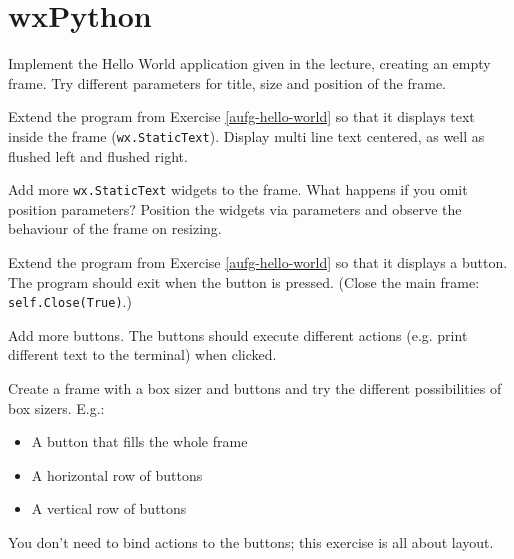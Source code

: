 \section*{wxPython}

\begin{aufgabe}
\label{aufg-hello-world}Implement the Hello World application given in the lecture, creating an empty frame. Try different parameters for title, size and position of the frame.
\end{aufgabe}

\begin{aufgabe}
\begin{teilaufgabe}
Extend the program from Exercise \ref{aufg-hello-world} so that it displays text inside the frame (\lstinline{wx.StaticText}). Display multi line text centered, as well as flushed left and flushed right.
\end{teilaufgabe}
\begin{teilaufgabe}
Add more \lstinline{wx.StaticText} widgets to the frame. What happens if you omit position parameters? Position the widgets via parameters and observe the behaviour of the frame on resizing.
\end{teilaufgabe}
\end{aufgabe}


\begin{aufgabe}[Buttons]
\begin{teilaufgabe}
Extend the program from Exercise \ref{aufg-hello-world} so that it displays a button. The program should exit when the button is pressed. (Close the main frame: \lstinline{self.Close(True)}.)
\end{teilaufgabe}
\begin{teilaufgabe}
Add more buttons. The buttons should execute different actions (e.g. print different text to the terminal) when clicked.
\end{teilaufgabe}
\end{aufgabe}

\begin{aufgabe}[Sizer]
\label{aufg-sizer}
Create a frame with a box sizer and buttons and try the different possibilities of box sizers. E.g.:
\begin{itemize}
\item A button that fills the whole frame
\item A horizontal row of buttons
\item A vertical row of buttons
\end{itemize}
You don't need to bind actions to the buttons; this exercise is all about layout.
\end{aufgabe}


